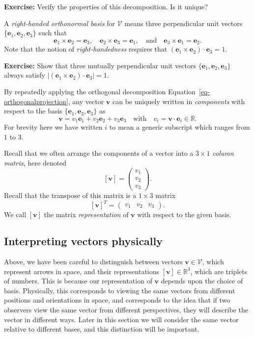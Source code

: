 \documentclass[
  letterpaper,
  DIV=11,
  numbers=noendperiod]{scrreprt}
\theoremstyle{plain}
\theoremstyle{remark}
\begin{document}
\textbf{Exercise:} Verify the properties of this decomposition. Is it
unique?

A \emph{right-handed orthonormal basis} for \({\mathcal{V}}\) means
three perpendicular unit vectors
\(\{{\boldsymbol{e}}_1,{\boldsymbol{e}}_2,{\boldsymbol{e}}_3\}\) such
that
\[{\boldsymbol{e}}_1\times{\boldsymbol{e}}_2={\boldsymbol{e}}_3,\quad{\boldsymbol{e}}_2\times{\boldsymbol{e}}_3={\boldsymbol{e}}_1,\quad\text{and}\quad{\boldsymbol{e}}_3\times{\boldsymbol{e}}_1 = {\boldsymbol{e}}_2.\]
Note that the notion of \emph{right-handedness} requires that
\(({\boldsymbol{e}}_1\times{\boldsymbol{e}}_2)\cdot{\boldsymbol{e}}_3=1\).

\textbf{Exercise:} Show that three mutually perpendicular unit vectors
\(\{{\boldsymbol{e}}_1,{\boldsymbol{e}}_2,{\boldsymbol{e}}_3\}\) always
satisfy
\(|({\boldsymbol{e}}_1\times{\boldsymbol{e}}_2)\cdot{\boldsymbol{e}}_3|=1\).

By repeatedly applying the orthogonal decomposition
Equation~\ref{eq-orthogonalprojection}, any vector \({\boldsymbol{v}}\)
can be uniquely written in \emph{components} with respect to the basis
\(\{{\boldsymbol{e}}_1,{\boldsymbol{e}}_2,{\boldsymbol{e}}_3\}\) as
\[{\boldsymbol{v}}= v_1{\boldsymbol{e}}_1+v_2{\boldsymbol{e}}_2+v_3{\boldsymbol{e}}_3\quad\text{with}\quad v_i = {\boldsymbol{v}}\cdot{\boldsymbol{e}}_i\in{\mathbb{R}}.\]
For brevity here we have written \(i\) to mean a generic subscript which
ranges from \(1\) to \(3\).

Recall that we often arrange the components of a vector into a
\(3\times1\) \emph{column matrix}, here denoted
\[[{\boldsymbol{v}}] = \left(\begin{array}{c} v_1 \\ v_2 \\ v_3 \end{array}\right).\]
Recall that the transpose of this matrix is a \(1\times3\) matrix
\[[{\boldsymbol{v}}]^T = \left(\begin{array}{ccc} v_1 & v_2 & v_3 \end{array}\right).\]
We call \([{\boldsymbol{v}}]\) the matrix \emph{representation} of
\({\boldsymbol{v}}\) with respect to the given basis.

\subsection{Interpreting vectors
physically}\label{interpreting-vectors-physically}

Above, we have been careful to distinguish between vectors
\({\boldsymbol{v}}\in{\mathcal{V}}\), which represent arrows in space,
and their representations \([{\boldsymbol{v}}]\in{\mathbb{R}}^3\), which
are triplets of numbers. This is because our representation of
\({\boldsymbol{v}}\) depends upon the choice of basis. Physically, this
corresponds to viewing the same vectors from different positions and
orientations in space, and corresponds to the idea that if two observers
view the same vector from different perspectives, they will describe the
vector in different ways. Later in this section we will consider the
same vector relative to different bases, and this distinction will be
important.
\end{document}
